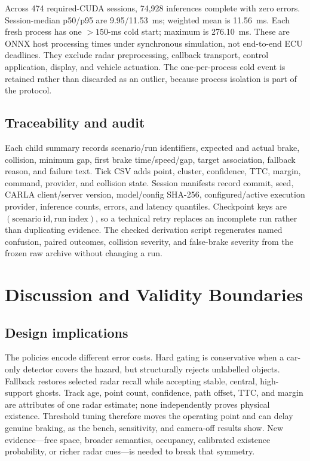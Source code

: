\documentclass[conference]{IEEEtran}
\begin{document}
Across 474 required-CUDA sessions, 74,928 inferences complete with zero errors.
Session-median p50/p95 are 9.95/11.53~ms; weighted mean is 11.56~ms. Each fresh
process has one $>150$-ms cold start; maximum is 276.10~ms. These are ONNX host
processing times under synchronous simulation, not end-to-end ECU deadlines.
They exclude radar preprocessing, callback transport, control application,
display, and vehicle actuation. The one-per-process cold event is retained rather
than discarded as an outlier, because process isolation is part of the protocol.

\subsection{Traceability and audit}
Each child summary records scenario/run identifiers, expected and actual brake,
collision, minimum gap, first brake time/speed/gap, target association, fallback
reason, and failure text. Tick CSV adds point, cluster, confidence, TTC, margin,
command, provider, and collision state. Session manifests record commit, seed,
CARLA client/server version, model/config SHA-256, configured/active execution
provider, inference counts, errors, and latency quantiles. Checkpoint keys are
$(\mathrm{scenario\ id},\mathrm{run\ index})$, so a technical retry replaces an
incomplete run rather than duplicating evidence. The checked derivation script
regenerates named confusion, paired outcomes, collision severity, and
false-brake severity from the frozen raw archive without changing a run.

\section{Discussion and Validity Boundaries}
\subsection{Design implications}
The policies encode different error costs. Hard gating is conservative when a
car-only detector covers the hazard, but structurally rejects unlabelled
objects. Fallback restores selected radar recall while accepting stable,
central, high-support ghosts. Track age, point count, confidence, path offset,
TTC, and margin are attributes of one radar estimate; none independently proves
physical existence. Threshold tuning therefore moves the operating point and
can delay genuine braking, as the bench, sensitivity, and camera-off results
show. New evidence---free space, broader semantics, occupancy, calibrated
existence probability, or richer radar cues---is needed to break that symmetry.
\end{document}
